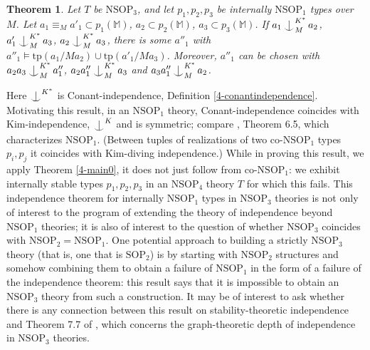 \documentclass[12pt]{amsart}
\newtheorem{theorem}{Theorem}[section]
\theoremstyle{definition}
\def\Ind#1#2{#1\setbox0=\hbox{$#1x$}\kern\wd0\hbox to 0pt{\hss$#1\mid$\hss}
\lower.9\ht0\hbox to 0pt{\hss$#1\smile$\hss}\kern\wd0}
\def\ind{\mathop{\mathpalette\Ind{}}}
\begin{document}
\begin{theorem}\label{4-main00}
    Let $T$ be $\mathrm{NSOP}_{3}$, and let $p_{1}, p_{2}, p_{3}$ be internally $\mathrm{NSOP}_{1}$ types over $M$. Let $a_{1} \equiv_{M} a'_{1} \subset p_{1}(\mathbb{M})$, $ a_{2} \subset p_{2}(\mathbb{M})$,  $ a_{3} \subset p_{3}(\mathbb{M})$.  If $a_{1} \ind^{K^{*}}_{M} a_{2}$, $a'_{1} \ind^{K^{*}}_{M} a_{3}$, $a_{2} \ind^{K^{*}}_{M} a_{3}$, there is some $a''_{1}$ with $a''_{1} \models \mathrm{tp}(a_{1}/Ma_{2}) \cup \mathrm{tp}(a'_{1}/Ma_{3})$. Moreover, $a''_{1}$ can be chosen with $a_{2}a_{3} \ind^{K^{*}}_{M}a''_{1}$, $a_{2}a''_{1} \ind^{K^{*}}_{M} a_{3}$ and $a_{3}a''_{1} \ind^{K^{*}}_{M} a_{2}$.
\end{theorem}

Here $\ind^{K^{*}}$ is Conant-independence, Definition \ref{4-conantindependence}. Motivating this result, in an $\mathrm{NSOP}_{1}$ theory, Conant-independence coincides with Kim-independence, $\ind^{K}$ and is symmetric; compare \cite{KR17}, Theorem 6.5, which characterizes $\mathrm{NSOP}_{1}$. (Between tuples of realizations of two co-$\mathrm{NSOP}_{1}$ types $p_{i}, p_{j}$ it coincides with Kim-diving independence.) While in proving this result, we apply Theorem \ref{4-main0}, it does not just follow from co-$\mathrm{NSOP}_{1}$: we exhibit internally stable types $p_{1}, p_{2}, p_{3}$ in an $\mathrm{NSOP}_{4}$ theory $T$ for which this fails. This independence theorem for internally $\mathrm{NSOP}_{1}$ types in $\mathrm{NSOP}_{3}$ theories is not only of interest to the program of extending the theory of independence beyond $\mathrm{NSOP}_{1}$ theories; it is also of interest to the question of whether $\mathrm{NSOP}_{3}$ coincides with $\mathrm{NSOP}_{2} = \mathrm{NSOP}_{1}$. One potential approach to building a strictly $\mathrm{NSOP}_{3}$ theory (that is, one that is $\mathrm{SOP}_{2}$) is by starting with $\mathrm{NSOP}_{2}$ structures and somehow combining them to obtain a failure of $\mathrm{NSOP}_{1}$ in the form of a failure of the independence theorem: this result says that it is impossible to obtain an $\mathrm{NSOP}_{3}$ theory from such a construction. It may be of interest to ask whether there is any connection between this result on stability-theoretic independence and Theorem 7.7 of \cite{Mal10b}, which concerns the graph-theoretic depth of independence in $\mathrm{NSOP}_{3}$ theories.
\end{document}
